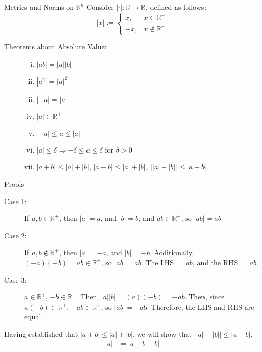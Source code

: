 \documentclass[8pt]{extarticle}
\newcommand{\R}{\mathbb{R}}
\begin{document}
  \begin{problem}{Metrics and Norms on $\R^n$}
    Consider $|\cdot|: \R \rightarrow \R$, defined as follows:
    \[
      |x| := \begin{cases}
        x,&x\in\R^+\\
        -x,&x\notin\R^+
      \end{cases}
    \] 
    \begin{description}
      \item[Theorems about Absolute Value:]\hfill
        \begin{enumerate}[(i)]
          \item $|ab| = |a||b|$
          \item $|a^2| = |a|^2$
          \item $|-a| = |a|$
          \item $|a|\in\R^+$
          \item $-|a| \leq a \leq |a|$
          \item $|a| \leq \delta \Rightarrow -\delta \leq a \leq \delta$ for $\delta > 0$
          \item $|a+b| \leq |a| + |b|$, $|a-b| \leq |a| + |b|$, $\vert|a| - |b|\vert \leq |a-b|$
        \end{enumerate}
    \end{description}
    \begin{problem}{Proofs}
      \begin{description}[font=\normalfont]
        \item[Proof of (i)]\hfill
          \begin{description}
            \item[Case 1:] If $a,b\in\R^+$, then $|a| = a$, and $|b| = b$, and $ab \in \R^+$, so $|ab| = ab$
            \item[Case 2:] If $a,b\notin\R^+$, then $|a| = -a$, and $|b| = -b$. Additionally, $(-a)(-b)=ab \in\R^+$, so $|ab| = ab$. The LHS $=ab$, and the RHS $=ab$.
            \item[Case 3:] $a\in\R^+$, $-b\in\R^+$. Then, $|a||b| = (a)(-b) = -ab$. Then, since $a(-b)\in\R^+$, $-ab\in\R^+$, so $|ab| = -ab$. Therefore, the LHS and RHS are equal.
          \end{description}
        \item[Proof of (vii)] Having established that $|a+b| \leq |a| + |b|$, we will show that $\vert|a| - |b|\vert \leq |a-b|$.
          \begin{align*}
            |a| &= |a-b+b| \\

\end{align*}
\end{description}
\end{problem}
\end{problem}
\end{document}
